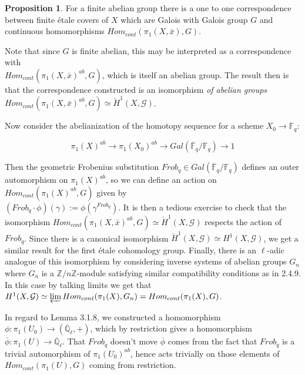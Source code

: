 \documentclass{ucbthesis}
\theoremstyle{definition}
\theoremstyle{theorem}
\newtheorem{prop}[thm]{Proposition}
\begin{document}
\begin{prop}
For a finite abelian group there is a one to one correspondence between finite \'{e}tale covers of $X$ which are Galois with Galois group $G$ and continuous homomorphisms $Hom_{cont}(\pi_{1}(X,\bar{x}),G)$. 
\end{prop}

Note that since $G$ is finite abelian, this may be interpreted as a correspondence with\\
 $Hom_{cont}(\pi_{1}(X,\bar{x})^{ab},G)$, which is itself an abelian group. The result then is that the
  correspondence constructed is an isomorphism \emph{of abelian groups}  $Hom_{cont}(\pi_{1}(X,\bar{x})^{ab},G) \simeq \check{H}^{1}(X,\mathcal{G})$. 

Now consider the abelianization of the homotopy sequence for a scheme $X_0\rightarrow \mathbb{F}_{q}$:

$$ \pi_{1}(X)^{ab} \rightarrow \pi_{1}(X_{0})^{ab} \rightarrow Gal(\overline{\mathbb{F}}_{q}/\mathbb{F}_{q}) \rightarrow 1$$

Then the geometric Frobenius substitution $Frob_{q}\in Gal(\overline{\mathbb{F}}_{q}/\mathbb{F}_{q})$ defines an outer automorphism on $\pi_{1}(X)^{ab}$, so we can define an action on $Hom_{cont}(\pi_{1}(X)^{ab},G)$ given by \\$(Frob_q\cdot \phi)(\gamma) := \phi(\gamma^{Frob_q})$. It is then a tedious exercise to check that the isomorphism $Hom_{cont}(\pi_{1}(X,\bar{x})^{ab},G) \simeq \check{H}^{1}(X,\mathcal{G})$ respects the action of $Frob_{q}$. Since there is a canonical isomorphism $\check{H}^{1}(X,\mathcal{G}) \simeq H^{1}(X,\mathcal{G})$, we get a similar result for the first \'{e}tale cohomology group. Finally, there is an $\ell$-adic analogue of this isomorphism by considering inverse systems of abelian groups $G_{n}$ where $G_{n}$ is a $\mathbb{Z}/n\mathbb{Z}$-module satisfying similar compatibility conditions as in 2.4.9. In this case by talking limits we get that $H^{1}(X,\mathcal{G}) \simeq \varprojlim Hom_{cont}(\pi_{1}(X),G_{n}) = Hom_{cont}(\pi_{1}(X),G)$. 

In regard to Lemma 3.1.8, we constructed a homomorphism $\phi:\pi_{1}(U_{0}) \rightarrow (\overline{\mathbb{Q}}_{\ell},+)$, which by restriction gives a homomorphism $\overline{\phi}:\pi_{1}(U)\rightarrow \overline{\mathbb{Q}}_{\ell}$. That $Frob_{q}$ doesn't move $\overline{\phi}$ comes from the fact that $Frob_{q}$ is a trivial automorphism of $\pi_{1}(U_0)^{ab}$, hence acts trivially on those elements of $Hom_{cont}(\pi_{1}(U),G)$ coming from restriction. 
\end{document}
